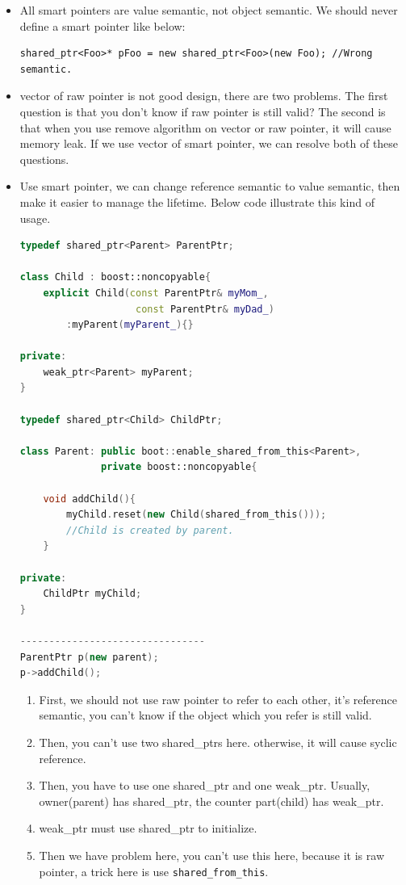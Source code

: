 \documentclass[a4paper,11pt,twoside]{book}
\begin{document}
\begin{itemize}
	\item All smart pointers are value semantic, not object semantic. We should never define a smart pointer like below:
	\begin{lstlisting}[numbers=none]
		shared_ptr<Foo>* pFoo = new shared_ptr<Foo>(new Foo); //Wrong semantic.
	\end{lstlisting}

	\item vector of raw pointer is not good design, there are two problems. The first question is that you don't know if raw pointer is still valid? The second is that when you use remove algorithm on vector or raw pointer, it will cause memory leak. If we use vector of smart pointer, we can resolve both of these questions. 
	
	\item Use smart pointer, we can change reference semantic to value semantic, then make it easier to manage the lifetime. Below code illustrate this kind of usage. 
	
\begin{lstlisting}[frame=single, language=c++, mathescape=true]
typedef shared_ptr<Parent> ParentPtr;

class Child : boost::noncopyable{
	explicit Child(const ParentPtr& myMom_,
					const ParentPtr& myDad_)
		:myParent(myParent_){}
		
private:
	weak_ptr<Parent> myParent;
} 

typedef shared_ptr<Child> ChildPtr;

class Parent: public boot::enable_shared_from_this<Parent>,
              private boost::noncopyable{
  
  	void addChild(){
  		myChild.reset(new Child(shared_from_this()));
  		//Child is created by parent.
  	}
		
private:
	ChildPtr myChild;
}

--------------------------------
ParentPtr p(new parent);
p->addChild();
\end{lstlisting}
\begin{enumerate}
	\item First, we should not use raw pointer to refer to each other, it's reference semantic, you can't know if the object which you refer is still valid.
	
	\item Then, you can't use two shared\_ptrs here. otherwise, it will cause syclic reference.
	
	\item Then, you have to use one shared\_ptr and one weak\_ptr. Usually, owner(parent) has shared\_ptr, the counter part(child) has weak\_ptr. 
	
	\item weak\_ptr must use shared\_ptr to initialize. 
	
	\item Then we have problem here, you can't use this here, because it is raw pointer, a trick here is use \texttt{shared\_from\_this}.
\end{enumerate}

	
\end{itemize}
\end{document}
